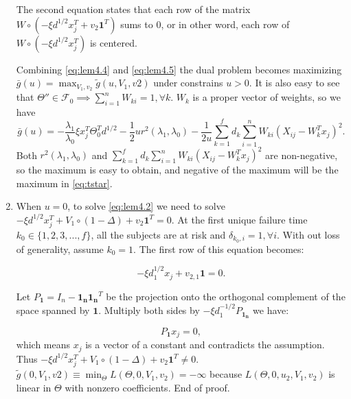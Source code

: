 \begin{enumerate}
    The second equation states that each row of the matrix $W\circ\left( -\xi d^{1/2} x_j^T+v_2\mathbf{1}^T\right)$ sums to 0, or in other word, each row of $W\circ\left(-\xi d^{1/2}x_j^T\right)$ is centered.

    Combining \eqref{eq:lem4.4} and \eqref{eq:lem4.5} the dual problem becomes maximizing $\bar{g}(u)=\max_{V_1,v_2}\tilde{g}(u,V_1,v2)$ under constrains $u>0$. It is also easy to see that $\Theta''\in\mathcal{F}_{0}\implies\sum_{i=1}^nW_{ki}=1,\forall k$. $W_k$ is a proper vector of weights, so we have
    \begin{equation}
        \label{eq:lem4.6}
        \bar{g}(u)=-\frac{\lambda_1}{\lambda_0}\xi x_j^T\Theta_{0}^Td^{1/2}-\frac{1}{2}ur^2(\lambda_1,\lambda_0)-\frac{1}{2u}\sum_{k=1}^fd_k\sum_{i=1}^nW_{ki}\left(X_{ij}-W_k^Tx_j\right)^2.
    \end{equation}
    Both $r^2(\lambda_1,\lambda_0)$ and $\sum_{k=1}^fd_k\sum_{i=1}^nW_{ki}\left(X_{ij}-W_k^Tx_j\right)^2$ are non-negative, so the maximum is easy to obtain, and negative of the maximum will be the maximum in \eqref{eq:tstar}.

    \item When $u=0$, to solve \eqref{eq:lem4.2} we need to solve $-\xi d^{1/2} x_j^T+V_1\circ(1-\Delta)+v_2\mathbf{1}^T=0.$ At the first unique failure time $k_0\in\{1,2,3,...,f\}$, all the subjects are at risk and $\delta_{k_0,i}=1,\forall i$. With out loss of generality, assume $k_0=1$. The first row of this equation becomes:

    \begin{equation}
        -\xi d_1^{1/2}x_j + v_{2,1}\mathbf{1}=0.
    \end{equation}

    Let $P_{\mathbf{1}}=I_n-\mathbf{1_n}\mathbf{1_n}^T$ be the projection onto the orthogonal complement of the space spanned by $\mathbf{1}$. Multiply both sides by $-\xi d^{-1/2}_1P_{\mathbf{1_n}}$ we have:

    \begin{equation}
        \label{eq:lem4.7}
        P_{\mathbf{1}}x_j=0,
    \end{equation}
    which means $x_j$ is a vector of a constant and contradicts the assumption. Thus $-\xi d^{1/2} x_j^T+V_1\circ(1-\Delta)+v_2\mathbf{1}^T\neq0.$ $\tilde{g}(0,V_1,v2)\equiv\min_\Theta L(\Theta,0,V_1,v_2)=-\infty$ because $L(\Theta,0,u_2,V_1,v_2)$ is linear in $\Theta$ with nonzero coefficients. End of proof.


\end{enumerate}


